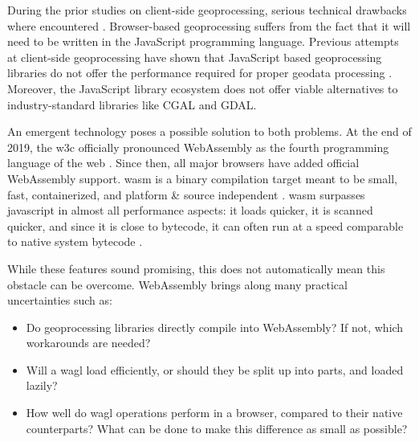 During the prior studies on client-side geoprocessing, serious technical drawbacks where encountered \cite{panidi_hybrid_2015, hamilton_client-side_2014}. Browser-based geoprocessing suffers from the fact that it will need to be written in the JavaScript programming language. Previous attempts at client-side geoprocessing have shown that JavaScript based geoprocessing libraries do not offer the performance required for proper geodata processing \cite{hamilton_client-side_2014}. 
Moreover, the JavaScript library ecosystem does not offer viable alternatives to industry-standard libraries like CGAL and GDAL. 

An emergent technology poses a possible solution to both problems. At the end of 2019, the \ac{w3c} officially pronounced WebAssembly as the fourth programming language of the web \cite{w3c_world_2019}. Since then, all major browsers have added official WebAssembly support. \ac{wasm} is a binary compilation target meant to be small, fast, containerized, and platform \& source independent \cite{haas_bringing_2017}. \ac{wasm} surpasses javascript in almost all performance aspects: it loads quicker, it is scanned quicker, and since it is close to bytecode, it can often run at a speed comparable to native system bytecode \cite{jangda_not_2019}. 

While these features sound promising, this does not automatically mean this obstacle can be overcome. WebAssembly brings along many practical uncertainties such as:

\begin{itemize}
  \item Do geoprocessing libraries directly compile into WebAssembly? If not, which workarounds are needed? 
  \item Will a \ac{wagl} load efficiently, or should they be split up into parts, and loaded lazily? 
  \item How well do \ac{wagl} operations perform in a browser, compared to their native counterparts? What can be done to make this difference as small as possible?
\end{itemize}

